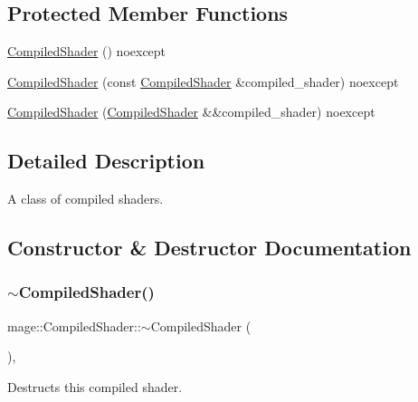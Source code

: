 \subsection*{Protected Member Functions}
\begin{DoxyCompactItemize}
\item 
\hyperlink{classmage_1_1_compiled_shader_a805edf097fd7b7af5c6e4f3829db2eda}{Compiled\+Shader} () noexcept
\item 
\hyperlink{classmage_1_1_compiled_shader_a2b7a4b283254781d5420e562d58fc49d}{Compiled\+Shader} (const \hyperlink{classmage_1_1_compiled_shader}{Compiled\+Shader} \&compiled\+\_\+shader) noexcept
\item 
\hyperlink{classmage_1_1_compiled_shader_a3f497ba71462ff3407d72034fee71c06}{Compiled\+Shader} (\hyperlink{classmage_1_1_compiled_shader}{Compiled\+Shader} \&\&compiled\+\_\+shader) noexcept
\end{DoxyCompactItemize}


\subsection{Detailed Description}
A class of compiled shaders. 

\subsection{Constructor \& Destructor Documentation}
\hypertarget{classmage_1_1_compiled_shader_a40805ed2bcd988824d130aeb07200f21}{}\label{classmage_1_1_compiled_shader_a40805ed2bcd988824d130aeb07200f21} 
\subsubsection{\texorpdfstring{$\sim$\+Compiled\+Shader()}{~CompiledShader()}}
{\footnotesize\ttfamily mage\+::\+Compiled\+Shader\+::$\sim$\+Compiled\+Shader (\begin{DoxyParamCaption}{ }\end{DoxyParamCaption})\hspace{0.3cm}{\ttfamily [virtual]}, {\ttfamily [default]}}

Destructs this compiled shader. \hypertarget{classmage_1_1_compiled_shader_a805edf097fd7b7af5c6e4f3829db2eda}{}\label{classmage_1_1_compiled_shader_a805edf097fd7b7af5c6e4f3829db2eda} 
